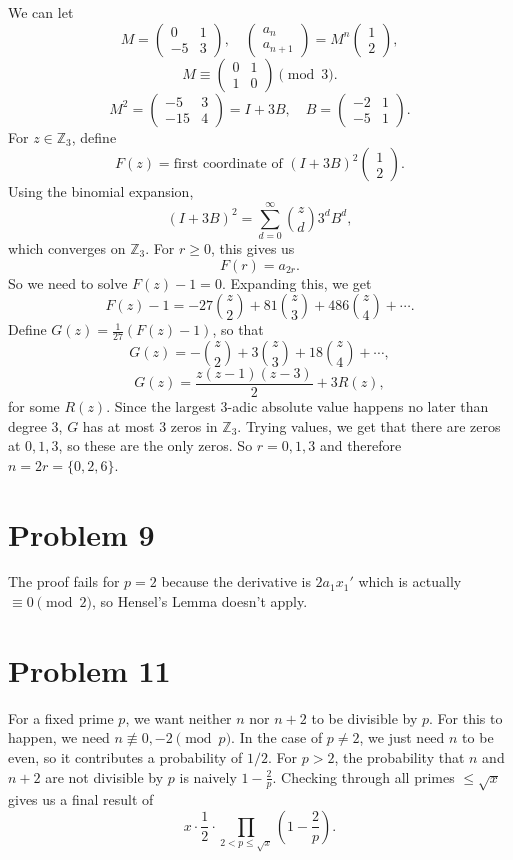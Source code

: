 \documentclass{article}
\newcommand{\Z}{\mathbb{Z}}
\newcommand{\bigp}[1]{\left(#1\right)}
\renewcommand{\vec}[2]{\begin{pmatrix}#1\\#2\end{pmatrix}}
\newcommand{\mat}[4]{\begin{pmatrix}#1&#2\\#3&#4\end{pmatrix}}
\begin{document}
We can let
$$M = \mat{0}{1}{-5}{3}, \quad \vec{a_n}{a_{n + 1}} = M^n\vec{1}{2},$$
$$M \equiv \mat{0}{1}{1}{0} \pmod{3}.$$
$$M^2 = \mat{-5}{3}{-15}{4} = I + 3B, \quad B = \mat{-2}{1}{-5}{1}.$$
For $z \in \Z_3$, define
$$F(z) = \text{first coordinate of } (I + 3B)^2\vec{1}{2}.$$
Using the binomial expansion,
$$(I + 3B)^2 = \sum_{d = 0}^\infty \binom{z}{d}3^dB^d,$$
which converges on $\Z_3$. For $r \ge 0$, this gives us
$$F(r) = a_{2r}.$$
So we need to solve $F(z) - 1 = 0$. Expanding this, we get
$$F(z) - 1 = -27\binom z2 + 81\binom z3 + 486\binom z4 + \cdots.$$
Define $G(z) = \frac{1}{27}(F(z) - 1)$, so that
$$G(z) = -\binom z2 + 3\binom z3 + 18\binom z4 + \cdots,$$
$$G(z) = \frac{z(z - 1)(z - 3)}{2} + 3R(z),$$
for some $R(z)$. Since the largest $3$-adic absolute value happens no later than degree $3$, $G$ has at most $3$ zeros in $\Z_3$. Trying values, we get that there are zeros at $0, 1, 3$, so these are the only zeros. So $r = 0, 1, 3$ and therefore $n = 2r = \{0, 2, 6\}$.

\section*{Problem 9}
The proof fails for $p = 2$ because the derivative is $2a_1x_1'$ which is actually $\equiv 0 \pmod{2}$, so Hensel's Lemma doesn't apply.

\section*{Problem 11}
For a fixed prime $p$, we want neither $n$ nor $n + 2$ to be divisible by $p$. For this to happen, we need $n \not\equiv  0, -2 \pmod{p}$. In the case of $p \neq 2$, we just need $n$ to be even, so it contributes a probability of $1/2$. For $p > 2$, the probability that $n$ and $n + 2$ are not divisible by $p$ is naively $1 - \frac{2}{p}$. Checking through all primes $\le \sqrt{x}$ gives us a final result of
$$x \cdot \frac{1}{2} \cdot \prod_{2 < p \le \sqrt{x}} \bigp{1 - \frac{2}{p}}.$$
\end{document}
